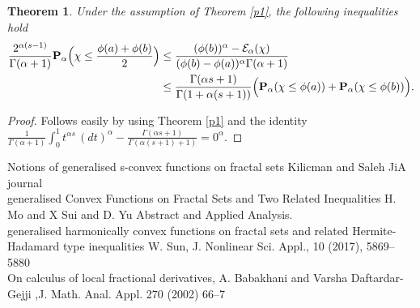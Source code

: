 \documentclass[10pt]{article}
\newtheorem{theo}{Theorem}[section]
\begin{document}
\begin{theo}
Under the assumption of Theorem \ref{p1}, the following inequalities hold
\begin{align}
\frac{2^{\alpha(s-1)}}{\Gamma(\alpha +1)} {\bf P}_\alpha\Big( \chi \leq \frac{\phi(a)+\phi(b)}{2} \Big) &\leq \frac{(\phi(b))^\alpha-\mathcal{E}_\alpha(\chi)}{(\phi(b)-\phi(a))^\alpha \Gamma(\alpha+1)} \nonumber
\\&\leq \frac{\Gamma(\alpha s +1)}{\Gamma(1+\alpha(s+1))}\Big( {\bf P}_\alpha(\chi\leq \phi(a)) + {\bf P}_\alpha(\chi\leq \phi(b))  \Big). \nonumber
\end{align}
\end{theo}
\begin{proof}
Follows easily by using Theorem \ref{p1} and the identity $\frac{1}{\Gamma(\alpha+1)}\int_0^1 t^{\alpha s}\, (dt)^\alpha -\frac{\Gamma(\alpha s+1)}{\Gamma(\alpha(s+1)+1)}=0^\alpha.$
\end{proof}





































































\iffalse


Notions of generalised s-convex functions on fractal sets Kilicman and Saleh JiA journal\\
generalised Convex Functions on Fractal Sets and Two Related Inequalities H. Mo and X Sui and D. Yu Abstract and Applied Analysis.\\
generalised harmonically convex functions on fractal sets and related
Hermite-Hadamard type inequalities W. Sun, J. Nonlinear Sci. Appl., 10 (2017), 5869–5880\\
On calculus of local fractional derivatives, A. Babakhani and Varsha Daftardar-Gejji ,J. Math. Anal. Appl. 270 (2002) 66–7
\end{document}
